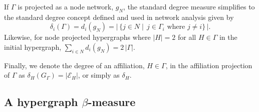 If $\Gamma$ is projected as a node network, $g_N$, the standard degree measure simplifies to the standard degree concept defined and used in network analysis given by
\begin{equation}
\delta_i (\Gamma ) = d_i (g_N ) = | \, \{ j \in N \mid \, j  \in \Gamma_{i} \mbox{ where } j \neq i \}  \, |.
\end{equation}
Likewise, for node projected hypergraphs where $| H | = 2$ for all $H \in \Gamma$ in the initial hypergraph, $\sum_{i \in N} d_i (g_{N}) = 2 \, | \Gamma |$.

Finally, we denote the degree of an affiliation, $H \in \Gamma$, in the affiliation projection of $\Gamma$ as $\delta_{H}(G_{\Gamma}) = | \mathcal{E}_{H} |$, or simply as $\delta_{H}$.

\subsection{A hypergraph $\beta$-measure}

